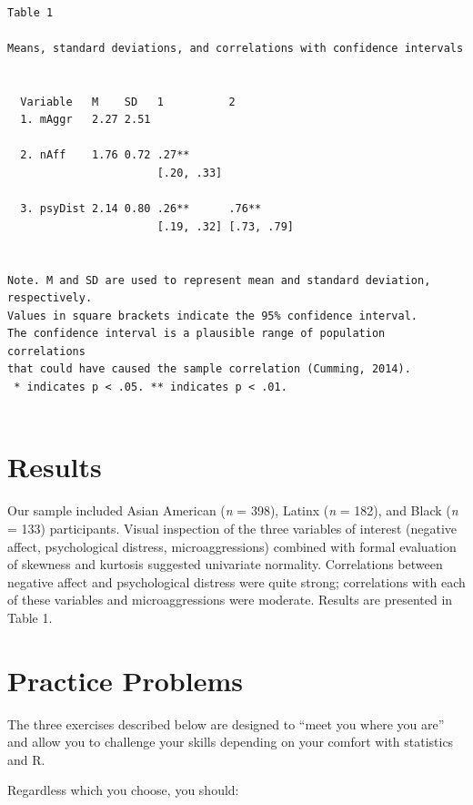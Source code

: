 \documentclass[
  english,
]{book}
\begin{document}
\begin{verbatim}

Table 1 

Means, standard deviations, and correlations with confidence intervals
 

  Variable   M    SD   1          2         
  1. mAggr   2.27 2.51                      
                                            
  2. nAff    1.76 0.72 .27**                
                       [.20, .33]           
                                            
  3. psyDist 2.14 0.80 .26**      .76**     
                       [.19, .32] [.73, .79]
                                            

Note. M and SD are used to represent mean and standard deviation, respectively.
Values in square brackets indicate the 95% confidence interval.
The confidence interval is a plausible range of population correlations 
that could have caused the sample correlation (Cumming, 2014).
 * indicates p < .05. ** indicates p < .01.
 
\end{verbatim}

\hypertarget{results}{%
\section{Results}\label{results}}

Our sample included Asian American (\emph{n} = 398), Latinx (\emph{n} = 182), and Black (\emph{n} = 133) participants. Visual inspection of the three variables of interest (negative affect, psychological distress, microaggressions) combined with formal evaluation of skewness and kurtosis suggested univariate normality. Correlations between negative affect and psychological distress were quite strong; correlations with each of these variables and microaggressions were moderate. Results are presented in Table 1.

\hypertarget{practice-problems}{%
\section{Practice Problems}\label{practice-problems}}

The three exercises described below are designed to ``meet you where you are'' and allow you to challenge your skills depending on your comfort with statistics and R.

Regardless which you choose, you should:
\end{document}
